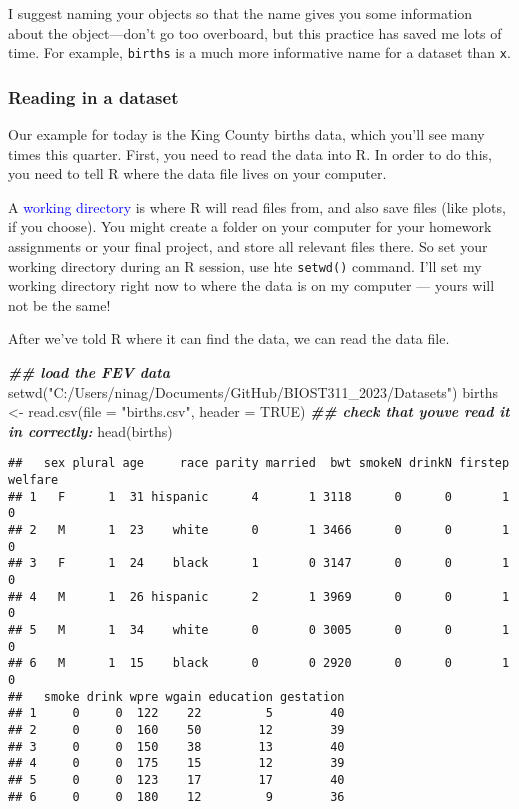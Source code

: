 \documentclass[
]{article}
\newenvironment{Shaded}{\begin{snugshade}}{\end{snugshade}}
\newcommand{\AttributeTok}[1]{\textcolor[rgb]{0.77,0.63,0.00}{#1}}
\newcommand{\ConstantTok}[1]{\textcolor[rgb]{0.00,0.00,0.00}{#1}}
\newcommand{\DocumentationTok}[1]{\textcolor[rgb]{0.56,0.35,0.01}{\textbf{\textit{#1}}}}
\newcommand{\FunctionTok}[1]{\textcolor[rgb]{0.00,0.00,0.00}{#1}}
\newcommand{\NormalTok}[1]{#1}
\newcommand{\OtherTok}[1]{\textcolor[rgb]{0.56,0.35,0.01}{#1}}
\newcommand{\StringTok}[1]{\textcolor[rgb]{0.31,0.60,0.02}{#1}}
\begin{document}
I suggest naming your objects so that the name gives you some
information about the object---don't go too overboard, but this practice
has saved me lots of time. For example, \texttt{births} is a much more
informative name for a dataset than \texttt{x}.

\hypertarget{reading-in-a-dataset}{%
\subsubsection{Reading in a dataset}\label{reading-in-a-dataset}}

Our example for today is the King County births data, which you'll see
many times this quarter. First, you need to read the data into R. In
order to do this, you need to tell R where the data file lives on your
computer.

A \textcolor{blue}{working directory} is where R will read files from,
and also save files (like plots, if you choose). You might create a
folder on your computer for your homework assignments or your final
project, and store all relevant files there. So set your working
directory during an R session, use hte \texttt{setwd()} command. I'll
set my working directory right now to where the data is on my computer
--- yours will not be the same!

After we've told R where it can find the data, we can read the data
file.

\begin{Shaded}
\begin{Highlighting}[]
\DocumentationTok{\#\# load the FEV data}
\FunctionTok{setwd}\NormalTok{(}\StringTok{"C:/Users/ninag/Documents/GitHub/BIOST311\_2023/Datasets"}\NormalTok{)}
\NormalTok{births }\OtherTok{\textless{}{-}} \FunctionTok{read.csv}\NormalTok{(}\AttributeTok{file =} \StringTok{"births.csv"}\NormalTok{, }
                \AttributeTok{header =} \ConstantTok{TRUE}\NormalTok{)}
\DocumentationTok{\#\# check that you\textquotesingle{}ve read it in correctly:}
\FunctionTok{head}\NormalTok{(births)}
\end{Highlighting}
\end{Shaded}

\begin{verbatim}
##   sex plural age     race parity married  bwt smokeN drinkN firstep welfare
## 1   F      1  31 hispanic      4       1 3118      0      0       1       0
## 2   M      1  23    white      0       1 3466      0      0       1       0
## 3   F      1  24    black      1       0 3147      0      0       1       0
## 4   M      1  26 hispanic      2       1 3969      0      0       1       0
## 5   M      1  34    white      0       0 3005      0      0       1       0
## 6   M      1  15    black      0       0 2920      0      0       1       0
##   smoke drink wpre wgain education gestation
## 1     0     0  122    22         5        40
## 2     0     0  160    50        12        39
## 3     0     0  150    38        13        40
## 4     0     0  175    15        12        39
## 5     0     0  123    17        17        40
## 6     0     0  180    12         9        36
\end{verbatim}
\end{document}
